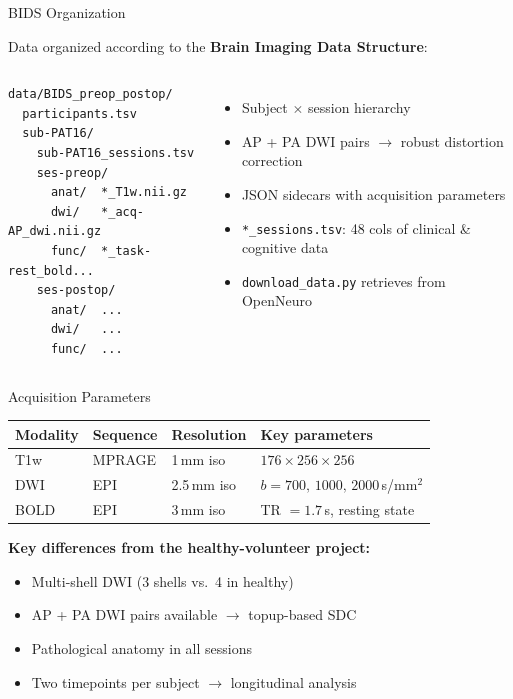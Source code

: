 \begin{frame}[fragile]{BIDS Organization}

  Data organized according to the \textbf{Brain Imaging Data Structure}:

  \bigskip

  \begin{columns}[T]
    \begin{lstlisting}
data/BIDS_preop_postop/
  participants.tsv
  sub-PAT16/
    sub-PAT16_sessions.tsv
    ses-preop/
      anat/  *_T1w.nii.gz
      dwi/   *_acq-AP_dwi.nii.gz
      func/  *_task-rest_bold...
    ses-postop/
      anat/  ...
      dwi/   ...
      func/  ...
    \end{lstlisting}

    \begin{itemize}
      \item Subject $\times$ session hierarchy
      \item AP + PA DWI pairs $\to$ robust distortion correction
      \item JSON sidecars with acquisition parameters
      \item \texttt{*\_sessions.tsv}: 48 cols of clinical \& cognitive data
      \item \texttt{download\_data.py} retrieves from OpenNeuro
    \end{itemize}
  \end{columns}

\end{frame}

\begin{frame}{Acquisition Parameters}

  \begin{tabular}{llll}
    \toprule
    \textbf{Modality} & \textbf{Sequence} & \textbf{Resolution} & \textbf{Key parameters} \\
    \midrule
    T1w  & MPRAGE & 1\,mm iso & $176 \times 256 \times 256$ \\
    DWI  & EPI    & 2.5\,mm iso & $b = 700,\, 1000,\, 2000$\,s/mm$^2$ \\
    BOLD & EPI    & 3\,mm iso & TR $= 1.7$\,s, resting state \\
    \bottomrule
  \end{tabular}

  \bigskip

  \textbf{Key differences from the healthy-volunteer project:}
  \begin{itemize}
    \item Multi-shell DWI (3 shells vs.\ 4 in healthy)
    \item AP + PA DWI pairs available $\to$ topup-based SDC
    \item Pathological anatomy in all sessions
    \item Two timepoints per subject $\to$ longitudinal analysis
  \end{itemize}

\end{frame}

